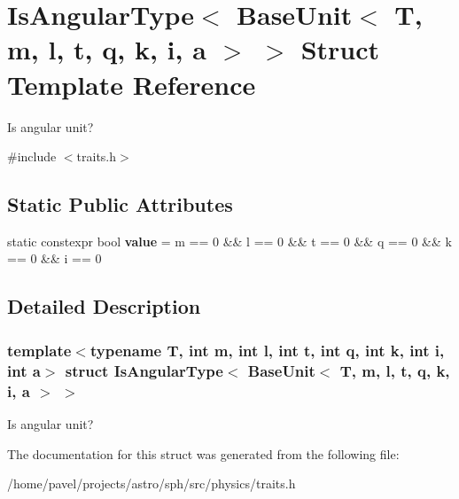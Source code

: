 \hypertarget{structIsAngularType_3_01BaseUnit_3_01T_00_01m_00_01l_00_01t_00_01q_00_01k_00_01i_00_01a_01_4_01_4}{}\section{Is\+Angular\+Type$<$ Base\+Unit$<$ T, m, l, t, q, k, i, a $>$ $>$ Struct Template Reference}
\label{structIsAngularType_3_01BaseUnit_3_01T_00_01m_00_01l_00_01t_00_01q_00_01k_00_01i_00_01a_01_4_01_4}


Is angular unit?  




{\ttfamily \#include $<$traits.\+h$>$}

\subsection*{Static Public Attributes}
\begin{DoxyCompactItemize}
\item 
\hypertarget{structIsAngularType_3_01BaseUnit_3_01T_00_01m_00_01l_00_01t_00_01q_00_01k_00_01i_00_01a_01_4_01_4_a88344a17b368645f845d59a109e76898}{}\label{structIsAngularType_3_01BaseUnit_3_01T_00_01m_00_01l_00_01t_00_01q_00_01k_00_01i_00_01a_01_4_01_4_a88344a17b368645f845d59a109e76898} 
static constexpr bool {\bfseries value} = m == 0 \&\& l == 0 \&\& t == 0 \&\& q == 0 \&\& k == 0 \&\& i == 0
\end{DoxyCompactItemize}


\subsection{Detailed Description}
\subsubsection*{template$<$typename T, int m, int l, int t, int q, int k, int i, int a$>$\newline
struct Is\+Angular\+Type$<$ Base\+Unit$<$ T, m, l, t, q, k, i, a $>$ $>$}

Is angular unit? 

The documentation for this struct was generated from the following file\+:\begin{DoxyCompactItemize}
\item 
/home/pavel/projects/astro/sph/src/physics/traits.\+h\end{DoxyCompactItemize}
